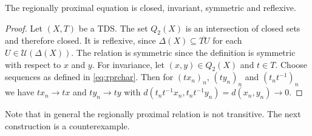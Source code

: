 \begin{theorem}
  The regionally proximal equation is closed, invariant, symmetric and reflexive.
\end{theorem}

\begin{proof}
  Let $(X, T)$ be a TDS.
  The set $Q_2(X)$ is an intersection of closed sets and therefore closed.
  It is reflexive, since $\Delta(X) \subseteq \overline{TU}$ for each $U \in \mathcal{U}(\Delta(X))$.
  The relation is symmetric since the definition is symmetric with respect to $x$ and $y$.
  For invariance, let $(x, y) \in Q_2(X)$ and $t \in T$.
  Choose sequences as defined in \cref{eq:rprchar}.
  Then for $(tx_n)_n$, $(t y_n)_n$ and $(t_nt^{-1})_n$ we have $t x_n \to tx$ and $t y_n \to ty$ with $d(t_nt^{-1}x_n, t_nt^{-1}y_n) = d(x_n, y_n) \to 0$.
\end{proof}

Note that in general the regionally proximal relation is not transitive.
The next construction is a counterexample.

